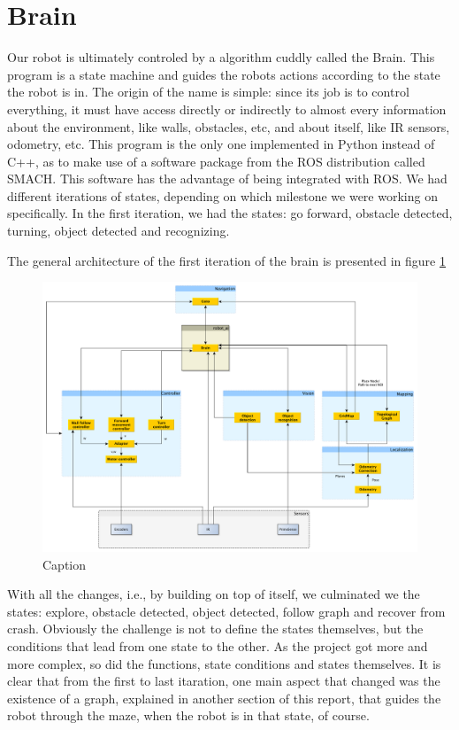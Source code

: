 \section{Brain}

Our robot is ultimately controled by a algorithm cuddly called the Brain.
This program is a state machine and guides the robots actions according to the state the robot is in.
The origin of the name is simple: since its job is to control everything, it must have access directly or indirectly to almost every information about the environment, like walls, obstacles, etc, and about itself, like IR sensors, odometry, etc.
This program is the only one implemented in Python instead of C++, as to make use of a software package from the ROS distribution called SMACH.
This software has the advantage of being integrated with ROS. 
We had different iterations of states, depending on which milestone we were working on specifically.
In the first iteration, we had the states: go forward, obstacle detected, turning, object detected and recognizing.

The general architecture of the first iteration of the brain is presented in figure \ref{fig:1st_architecture}

\begin{figure}
\centering
\includegraphics[width=1.0\textwidth]{figures/architecture_full.pdf}
\caption{Caption}
\label{fig:1st_architecture}
\end{figure}

With all the changes, i.e., by building on top of itself, we culminated we the states: explore, obstacle detected, object detected, follow graph and recover from crash.
Obviously the challenge is not to define the states themselves, but the conditions that lead from one state to the other.
As the project got more and more complex, so did the functions, state conditions and states themselves.
It is clear that from the first to last itaration, one main aspect that changed was the existence of a graph, explained in another section of this report, that guides the robot through the maze, when the robot is in that state, of course.

